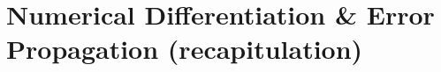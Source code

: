 \documentclass[structabstract]{aa}
\begin{document}
\section{Numerical Differentiation \& Error Propagation (recapitulation)}
\label{sect:num_diff_errors}

\begin{figure}[!t]
\centering
{}

\end{figure}
\end{document}
